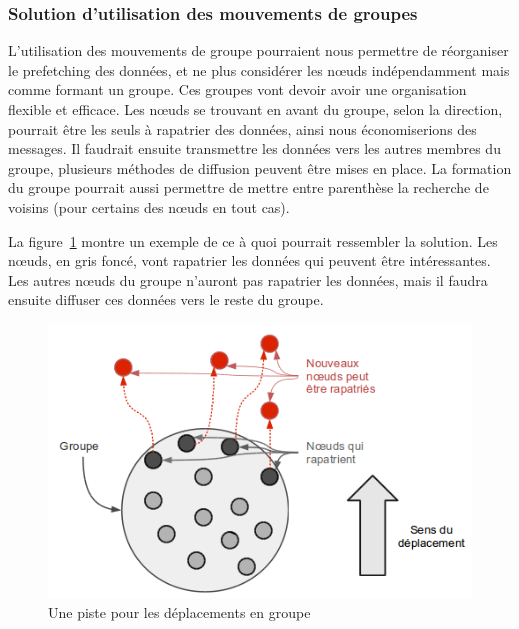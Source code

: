 \subsubsection{Solution d'utilisation des mouvements de groupes}
\par L'utilisation des mouvements de groupe pourraient nous permettre de réorganiser le prefetching des données, et ne plus considérer les nœuds indépendamment mais comme formant un groupe. Ces groupes vont devoir avoir une organisation flexible et efficace. Les nœuds se trouvant en avant du groupe, selon la direction, pourrait être les seuls à rapatrier des données, ainsi nous économiserions des messages. Il faudrait ensuite transmettre les données vers les autres membres du groupe, plusieurs méthodes de diffusion peuvent être mises en place. La formation du groupe pourrait aussi permettre de mettre entre parenthèse la recherche de voisins (pour certains des nœuds en tout cas). 
\par La figure~\ref{mouvgroup} montre un exemple de ce à quoi pourrait ressembler la solution. Les nœuds, en gris foncé, vont rapatrier les données qui peuvent être intéressantes. Les autres nœuds du groupe n'auront pas rapatrier les données, mais il faudra ensuite diffuser ces données vers le reste du groupe.

	\vspace{1cm}
        \begin{figure}[!h]
        \centering
        \includegraphics[scale=0.65]{./Ressources/Images/mouvgroup.png}
        \caption{Une piste pour les déplacements en groupe}
        \label{mouvgroup}
        \end{figure}

\newpage
 
